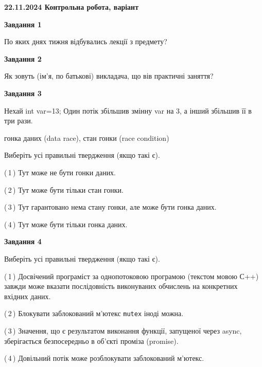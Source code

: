 \documentclass[12pt, ukrainian]{article}
\def\code#1{\Verb!#1!}
\begin{document}
\begin {large}

\textbf{22.11.2024 Контрольна робота, варіант  }\par


{

\begin{center}
\textbf{Завдання 1}
\end{center}

По яких днях тижня відбувались лекції з предмету?


\begin{center}
\textbf{Завдання 2}
\end{center}

Як зовуть (ім'я, по батькові) викладача, що вів практичні заняття?


\begin{center}
\textbf{Завдання 3}
\end{center}

Нехай int var=13; Один потік збільшив змінну var на 3, а інший збільшив її в три рази.

гонка даних (data race), стан гонки (race condition)

Виберіть усі правильні твердження (якщо такі є).\par
\vspace{2mm}
(\,1\,) Тут може не бути гонки даних.%

(\,2\,) Тут може бути тільки стан гонки.%

(\,3\,) Тут гарантовано нема стану гонки, але може бути гонка даних.%

(\,4\,) Тут може бути тільки гонка даних.%


\begin{center}
\textbf{Завдання 4}
\end{center}

Виберіть усі правильні твердження (якщо такі є).\par
\vspace{2mm}

(\,1\,) Досвічений програміст за однопотоковою програмою (текстом мовою С++) завжди може вказати послідовність виконуваних обчислень на конкретних вхідних даних.%

(\,2\,) Блокувати заблокований м’ютекс  \code{mutex} іноді можна.%

(\,3\,) Значення, що є результатом виконання функції, запущеної через async, зберігається безпосередньо в об’єкті проміза (promise).%

(\,4\,) Довільний потік може розблокувати заблокований м’ютекс.%


}
\end{large}
\end{document}
